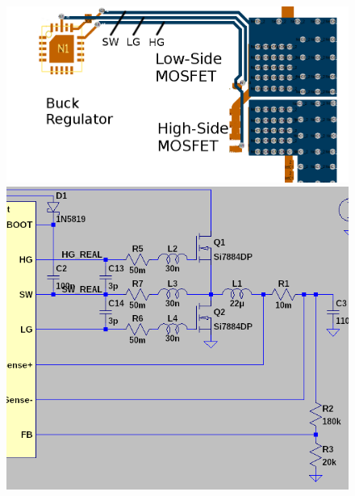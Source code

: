 \begin{figure}[th!]
    \centering
    \begin{minipage}{.6\textwidth}
        \centering
        \includegraphics[width=.9\textwidth]{images/pcb/long_traces.png}
        \caption{}
        \label{fig:verification:long_traces_pcb}
    \end{minipage}
    \begin{minipage}{.38\textwidth}
        \centering
        \includegraphics[width=.9\textwidth]{images/sim/lt3741_transients_circuit_real.png}
        \caption{}
        \label{fig:verification:long_traces_model}
    \end{minipage}
\end{figure}

